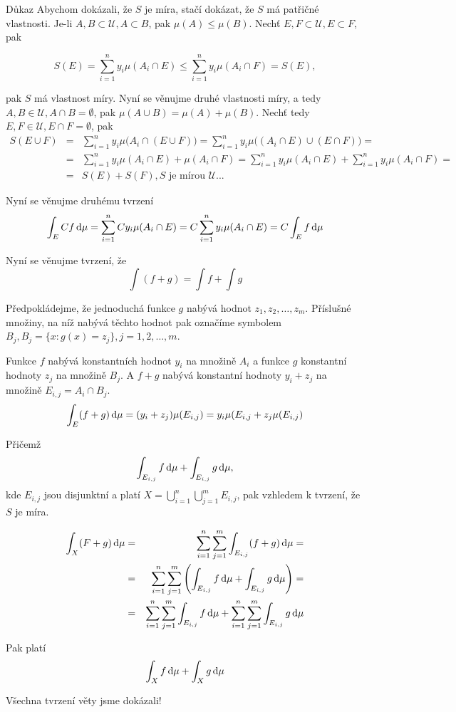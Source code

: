 \begin{note}{Důkaz}
Abychom dokázali, že $S$ je míra, stačí dokázat, že $S$ má patřičné vlastnosti. Je-li $A,B\subset \mathscr{U}, A\subset B$, pak $\mu(A)\leq \mu(B)$. Nechť $E,F\subset\mathscr{U}, E\subset F$, pak

\[ S(E) = \sum_{i=1}^{n}y_i\mu(A_i\cap E)\leq \sum_{i=1}^{n}y_i\mu(A_i\cap F)=S(E), \]

pak $S$ má vlastnost míry. Nyní se věnujme druhé vlastnosti míry, a tedy $A,B\in\mathscr{U}, A\cap B=\emptyset$, pak $\mu(A\cup B)=\mu(A) + \mu(B)$. Nechť tedy $E,F\in\mathscr{U}, E\cap F=\emptyset$, pak 
\begin{eqnarray*}
S(E\cup F) &=& \sum_{i=1}^{n}y_i\mu\big(A_i\cap (E\cup F)\big) = \sum_{i=1}^{n}y_i\mu\big((A_i\cap E)\cup (E\cap F)\big)=\\
&=& \sum_{i=1}^{n}y_i \mu(A_i\cap E)+\mu(A_i\cap F)=\sum_{i=1}^n y_i\mu(A_i\cap E) + \sum_{i=1}^n y_i\mu(A_i\cap F)=\\
&=& S(E) + S(F), \text{$S$ je mírou $\mathscr{U}$}
...\end{eqnarray*}

Nyní se věnujme druhému tvrzení
\[ \int_E C f\,\mathrm{d} \mu = \sum_{i=1}^{n} C y_i\mu (A_i\cap E)=C\sum_{i=1}^n y_i\mu(A_i\cap E)=C\int_E f\,\mathrm{d} \mu \]

Nyní se věnujme tvrzení, že 
\[ \int (f+g) = \int f + \int g \]

Předpokládejme, že jednoduchá funkce $g$ nabývá hodnot $z_1,z_2,\ldots, z_m$. Příslušné množiny, na níž nabývá těchto hodnot pak označíme symbolem $B_j, B_j=\{x: g(x)=z_j\},j=1,2,\ldots,m $.\br

Funkce $f$ nabývá konstantních hodnot $y_i$ na množině $A_i$ a funkce $g$ konstantní hodnoty $z_j$ na množině $B_j$. A $f+g$ nabývá konstantní hodnoty $y_i+z_j$ na množině $E_{i,j}=A_i\cap B_j$.
\[ \int_E (f+g)\,\mathrm{d} \mu = (y_i+z_j)\mu(E_{i,j})=y_i\mu(E_{i,j}+z_j\mu(E_{i,j}) \]

Přičemž
\[ \int_{E_{i,j}} f\,\mathrm{d} \mu + \int_{E_{i,j}} g\,\mathrm{d} \mu, \]
kde $E_{i,j}$ jsou disjunktní a platí $X=\bigcup_{i=1}^n\bigcup_{j=1}^m E_{i,j}$, pak vzhledem k tvrzení, že $S$ je míra.

\begin{eqnarray*}
\int_X (F+g)\,\mathrm{d} \mu &=& \sum_{i=1}^n\sum_{j=1}^m\int_{E_{i,j}}(f+g)\,\mathrm{d} \mu =\\
&=&\sum_{i=1}^n\sum_{j=1}^m \left( \int_{E_{i,j}}f\,\mathrm{d} \mu + \int_{E_{i,j}}g\,\mathrm{d} \mu\right)=\\
&=& \sum_{i=1}^n\sum_{j=1}^m\int_{E_{i,j}}f\,\mathrm{d} \mu + \sum_{i=1}^n\sum_{j=1}^m\int_{E_{i,j}}g\,\mathrm{d} \mu
\end{eqnarray*}

Pak platí
\[ \int_X f\,\mathrm{d} \mu + \int_X g\,\mathrm{d} \mu \]

Všechna tvrzení věty jsme dokázali!
\end{note}

